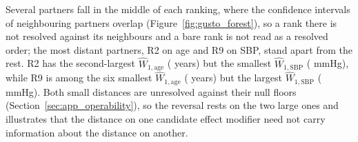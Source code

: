 \documentclass[AMA,Times1COL]{WileyNJDv5}
\begin{document}


Several partners fall in the middle of each ranking, where the confidence intervals of neighbouring partners overlap (Figure~\ref{fig:gusto_forest}), so a rank there is not resolved against its neighbours and a bare rank is not read as a resolved order; the most distant partners, R2 on age and R9 on SBP, stand apart from the rest. R2 has the second-largest $\widehat{W}_{1,\text{age}}$ ( years) but the smallest $\widehat{W}_{1,\text{SBP}}$ ( mmHg), while R9 is among the six smallest $\widehat{W}_{1,\text{age}}$ ( years) but the largest $\widehat{W}_{1,\text{SBP}}$ ( mmHg). Both small distances are unresolved against their null floors (Section~\ref{sec:app_operability}), so the reversal rests on the two large ones and illustrates that the distance on one candidate effect modifier need not carry information about the distance on another.
\end{document}
